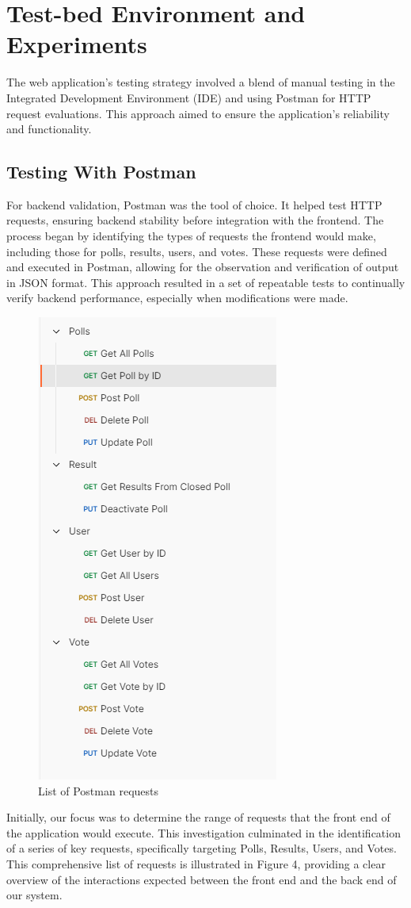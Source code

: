 \section{Test-bed Environment and Experiments}
\label{sec:evaluation}

The web application's testing strategy involved a blend of manual testing in the Integrated Development Environment (IDE) and using Postman for HTTP request evaluations. This approach aimed to ensure the application's reliability and functionality.

\subsection{Testing With Postman}

For backend validation, Postman was the tool of choice. It helped test HTTP requests, ensuring backend stability before integration with the frontend. The process began by identifying the types of requests the frontend would make, including those for polls, results, users, and votes. These requests were defined and executed in Postman, allowing for the observation and verification of output in JSON format. This approach resulted in a set of repeatable tests to continually verify backend performance, especially when modifications were made.

\begin{figure}[!htbp]
    \centering
    \includegraphics[width=0.3\linewidth]{figs/PostmanRequests.png}
    \caption{List of Postman requests}
    \label{fig:PostReq}
\end{figure}

Initially, our focus was to determine the range of requests that the front end of the application would execute. This investigation culminated in the identification of a series of key requests, specifically targeting Polls, Results, Users, and Votes. This comprehensive list of requests is illustrated in Figure 4, providing a clear overview of the interactions expected between the front end and the back end of our system.

